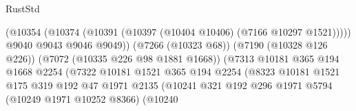 \begin{lexlean}{RustStd}
\begin{coremodule}
                                                    (@10354
                                                      (@10374
                                                        (@10391
                                                          (@10397
                                                            (@10404 @10406)
                                                            (@7166 @10297 @1521)))))
                                                    @9040
                                                    @9043
                                                    @9046
                                                    @9049))
                                                (@7266 (@10323 @68))
                                                (@7190 (@10328 @126 @226))
                                                (@7072 (@10335 @226 @98 @1881 @1668))
                                                (@7313
                                                  @10181
                                                  @365
                                                  @194
                                                  @1668
                                                  @2254
                                                  (@7322
                                                    @10181
                                                    @1521
                                                    @365
                                                    @194
                                                    @2254
                                                    (@8323
                                                      @10181
                                                      @1521
                                                      @175
                                                      @319
                                                      @192
                                                      @47
                                                      @1971
                                                      @2135
                                                      (@10241
                                                        @321
                                                        @192
                                                        @296
                                                        @1971
                                                        @5794
                                                        (@10249 @1971 @10252 @8366)
                                                        (@10240

\end{coremodule}
\end{lexlean}
